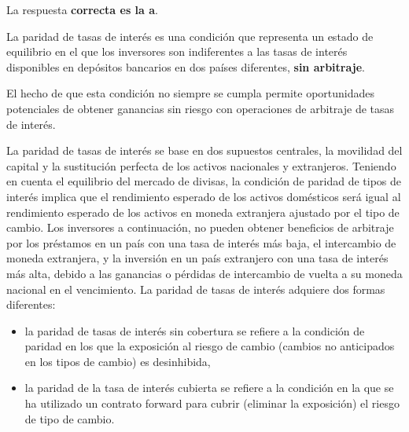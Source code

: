 \documentclass[
  letterpaper,
  DIV=11,
  numbers=noendperiod]{scrreprt}
\begin{document}
\begin{tcolorbox}[enhanced jigsaw, left=2mm, opacityback=0, colback=white, breakable, arc=.35mm, bottomrule=.15mm, rightrule=.15mm, toprule=.15mm, leftrule=.75mm, colframe=quarto-callout-tip-color-frame]
\begin{minipage}[t]{5.5mm}
\textcolor{quarto-callout-tip-color}{\faLightbulb}
\end{minipage}%
\begin{minipage}[t]{\textwidth - 5.5mm}

La respuesta \textbf{correcta es la a}.

La paridad de tasas de interés es una condición que representa un estado
de equilibrio en el que los inversores son indiferentes a las tasas de
interés disponibles en depósitos bancarios en dos países diferentes,
\textbf{sin arbitraje}.

El hecho de que esta condición no siempre se cumpla permite
oportunidades potenciales de obtener ganancias sin riesgo con
operaciones de arbitraje de tasas de interés.

La paridad de tasas de interés se base en dos supuestos centrales, la
movilidad del capital y la sustitución perfecta de los activos
nacionales y extranjeros. Teniendo en cuenta el equilibrio del mercado
de divisas, la condición de paridad de tipos de interés implica que el
rendimiento esperado de los activos domésticos será igual al rendimiento
esperado de los activos en moneda extranjera ajustado por el tipo de
cambio. Los inversores a continuación, no pueden obtener beneficios de
arbitraje por los préstamos en un país con una tasa de interés más baja,
el intercambio de moneda extranjera, y la inversión en un país
extranjero con una tasa de interés más alta, debido a las ganancias o
pérdidas de intercambio de vuelta a su moneda nacional en el
vencimiento. La paridad de tasas de interés adquiere dos formas
diferentes:

\begin{itemize}
\item
  la paridad de tasas de interés sin cobertura se refiere a la condición
  de paridad en los que la exposición al riesgo de cambio (cambios no
  anticipados en los tipos de cambio) es desinhibida,
\item
  la paridad de la tasa de interés cubierta se refiere a la condición en
  la que se ha utilizado un contrato forward para cubrir (eliminar la
  exposición) el riesgo de tipo de cambio.
\end{itemize}

\end{minipage}%
\end{tcolorbox}
\end{document}
